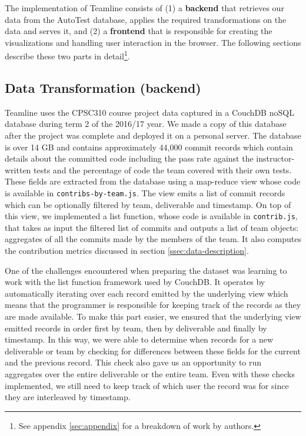 \documentclass[../manifest.tex]{subfiles}
\begin{document}
The implementation of Teamline consists of (1) a \textbf{backend} that retrieves our data from the AutoTest database, applies the required transformations on the data and serves it, and (2) a \textbf{frontend} that is responsible for creating the visualizations and handling user interaction in the browser. The following sections describe these two parts in detail\footnote{See appendix \ref{sec:appendix} for a breakdown of work by authors.}.

\subsection{Data Transformation (backend)}
Teamline uses the CPSC310 course project data captured in a CouchDB noSQL database during term 2 of the 2016/17 year. We made a copy of this database after the project was complete and deployed it on a personal server. The database is over 14 GB and contains approximately 44,000 commit records which contain details about the committed code including the pass rate against the instructor-written tests and the percentage of code the team covered with their own tests. These fields are extracted from the database using a map-reduce view whose code is available in \texttt{contribs-by-team.js}. The view emits a list of commit records which can be optionally filtered by team, deliverable and timestamp. On top of this view, we implemented a list function, whose code is available in \texttt{contrib.js}, that takes as input the filtered list of commits and outputs a list of team objects: aggregates of all the commits made by the members of the team. It also computes the contribution metrics discussed in section \ref{ssec:data-description}.

One of the challenges encountered when preparing the dataset was learning to work with the list function framework used by CouchDB. It operates by automatically iterating over each record emitted by the underlying view which means that the programmer is responsible for keeping track of the records as they are made available. To make this part easier, we ensured that the underlying view emitted records in order first by team, then by deliverable and finally by timestamp. In this way, we were able to determine when records for a new deliverable or team by checking for differences between these fields for the current and the previous record. This check also gave us an opportunity to run aggregates over the entire deliverable or the entire team. Even with these checks implemented, we still need to keep track of which user the record was for since they are interleaved by timestamp.
%
%
\end{document}
